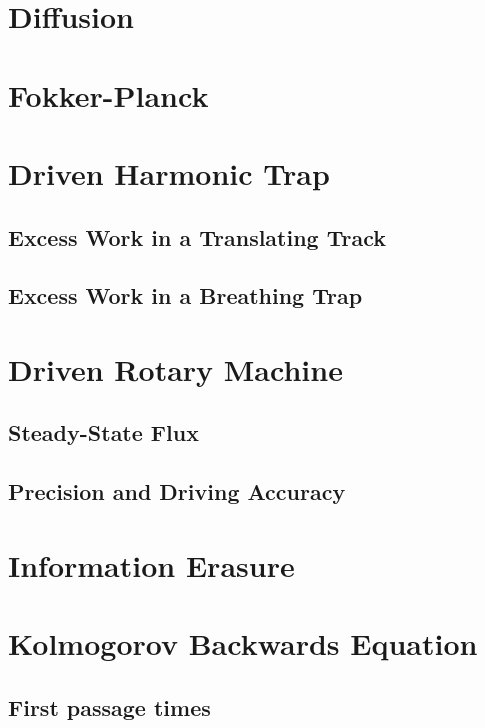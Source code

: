 \documentclass[15pt]{article}
\begin{document}
\section{\label{sec:diffusion-term}Diffusion}

\section{Fokker-Planck}


\section{Driven Harmonic Trap}

    \subsection{Excess Work in a Translating Track}

    \subsection{Excess Work in a Breathing Trap}


    \section{Driven Rotary Machine}

    \subsection{Steady-State Flux}

    \subsection{Precision and Driving Accuracy}

    \section{Information Erasure}

    \section{Kolmogorov Backwards Equation}

    \subsection{First passage times}
\end{document}
